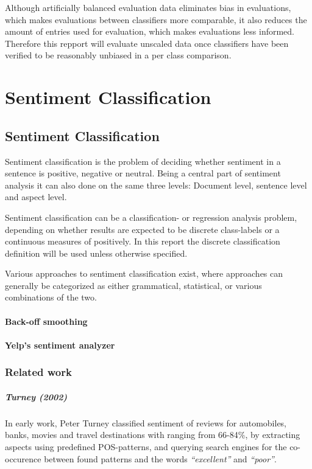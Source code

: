\documentclass[a4paper,11pt]{kth-mag}
\begin{document}
Although artificially balanced evaluation data eliminates bias in evaluations, which makes evaluations between classifiers more comparable, it also reduces the amount of entries used for evaluation, which makes evaluations less informed. Therefore this repport will evaluate unscaled data once classifiers have been verified to be reasonably unbiased in a per class comparison.


\part{Sentiment Classification}
\chapter{Sentiment Classification}
Sentiment classification is the problem of deciding whether sentiment in a sentence is positive, negative or neutral\cite{nlp_book}. Being a central part of sentiment analysis it can also done on the same three levels: Document level, sentence level and aspect level.

Sentiment classification can be a classification- or regression analysis problem\cite{liu2012sentiment}, depending on whether results are expected to be discrete class-labels or a continuous measures of positively. In this report the discrete classification definition will be used unless otherwise specified.

Various approaches to sentiment classification exist, where approaches can generally be categorized as either grammatical\cite{todo}, statistical\cite{todo}, or various combinations of the two.




\subsection{Back-off smoothing}

\subsection{Yelp's sentiment analyzer}



\section{Related work}

\subsubsection{Turney (2002)}
In early work, Peter Turney classified sentiment of reviews for automobiles, banks, movies and travel destinations with ranging from 66-84\%, by extracting aspects using predefined POS-patterns, and querying search engines for the co-occurence between found patterns and the words \emph{``excellent''} and \emph{``poor''}.
\end{document}
